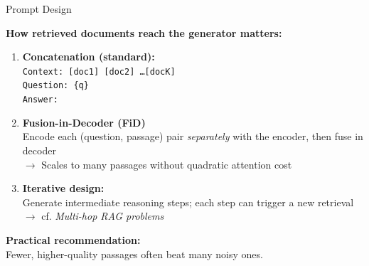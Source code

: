 \documentclass[11pt,compress,t,notes=noshow, xcolor=table]{beamer}
\begin{document}
\begin{frame}{Prompt Design}

\vfill

\textbf{How retrieved documents reach the generator matters:}

\vspace{0.5em}

\begin{enumerate}
    \item \textbf{Concatenation (standard):}\\
          \texttt{Context: [doc1] [doc2] \ldots [docK]\\Question: \{q\}\\Answer:}
    \vspace{0.4em}
    \item \textbf{Fusion-in-Decoder (FiD)} \\
          Encode each (question, passage) pair \textit{separately} with the encoder, then fuse in decoder\\
          $\rightarrow$ Scales to many passages without quadratic attention cost
    \vspace{0.4em}
    \item \textbf{Iterative design:}\\
          Generate intermediate reasoning steps; each step can trigger a new retrieval $\rightarrow$ cf. \textit{Multi-hop RAG problems}
\end{enumerate}

\vfill

\textbf{Practical recommendation:}\\ Fewer, higher-quality passages often beat many noisy ones.

\vfill

\end{frame}

\end{document}

